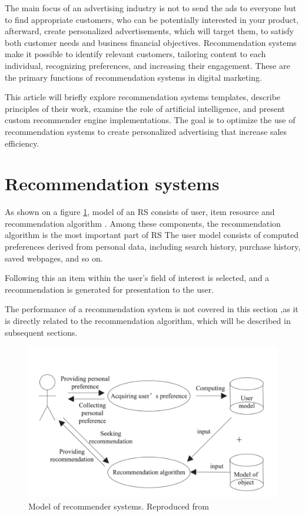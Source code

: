 \documentclass[10pt,twoside,english,a4paper]{article}
\begin{document}
\medskip The main focus of an advertising industry is not to send the ads to everyone but to find appropriate customers, who can be potentially interested in your product, afterward, create personalized advertisements, which will target them, to satisfy both customer needs and business financial objectives. Recommendation systems make it possible to identify relevant customers, tailoring content to each individual, recognizing preferences, and increasing their engagement. These are the primary functions of recommendation systems in digital marketing.

\medskip This article will briefly explore recommendation systems templates, describe principles of their work, examine the role of artificial intelligence, and present custom recommender engine implementations. The goal is to optimize the use of recommendation systems to create personalized advertising that increase sales efficiency.


\section{Recommendation systems}
As shown on a figure \ref{fig:fig1}, model of an RS consists of user, item resource and recommendation algorithm \cite{8506344}.
Among these components, the recommendation algorithm is the most important part of RS\cite{ren2012research}\cite{zhang2015research}
The user model consists of computed preferences derived from personal data, including search history, purchase history, saved webpages, and so on.

Following this an item within the user’s field of interest is selected, and a recommendation is generated for presentation to the user.

The performance of a recommendation system is not covered in this section ,as it is directly related to the recommendation algorithm, which will be described in subsequent sections.

\begin{figure}[H]
	\includegraphics[width=1\textwidth]{./diagrams/recommender_system_model.png}
	\caption{Model of recommender systems. Reproduced from \cite{8506344}}
	\label{fig:fig1}
\end{figure}
\end{document}
